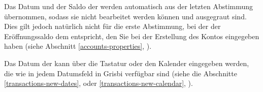 Das Datum und der Saldo der  werden automatisch aus der letzten Abstimmung übernommen, sodass sie nicht bearbeitet werden können und ausgegraut sind. Dies gilt jedoch natürlich nicht für die erste Abstimmung, bei der der Eröffnungssaldo dem entspricht, den Sie bei der Erstellung des Kontos eingegeben haben (siehe Abschnitt \vref{accounts-properties}, ).

Das Datum der  kann über die Tastatur oder den Kalender eingegeben werden, die wie in jedem Datumsfeld in Grisbi verfügbar sind (siehe die Abschnitte \vref{transactions-new-dates},  oder \vref{transactions-new-calendar}, ).

